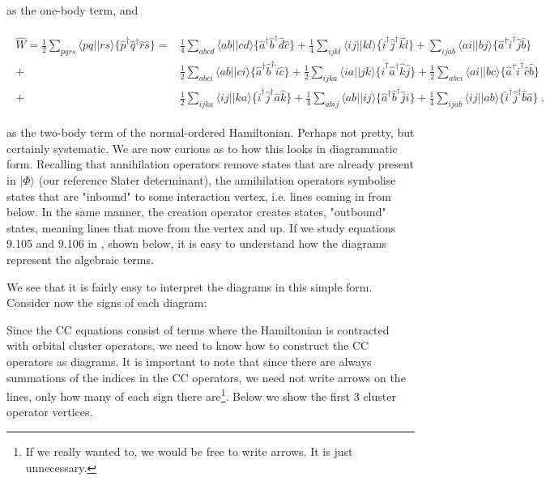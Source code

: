 	\noindent as the one-body term, and
	
	\begin{align}
		\begin{split}
		\hat{W} = \frac{1}{2}\sum_{pqrs}\langle pq||rs\rangle \{\hat{p}^\dagger\hat{q}^\dagger\hat{r}\hat{s}\} = &\frac{1}{4}\sum_{abcd}\langle ab||cd\rangle \{\hat{a}^\dagger\hat{b}^\dagger\hat{d}\hat{c}\} + \frac{1}{4}\sum_{ijkl}\langle ij||kl\rangle \{\hat{i}^\dagger\hat{j}^\dagger\hat{k}\hat{l}\} + \sum_{ijab}\langle ai||bj\rangle \{\hat{a}^\dagger\hat{i}^\dagger\hat{j}\hat{b}\} \\
		+&\frac{1}{2}\sum_{abci}\langle ab||ci\rangle \{\hat{a}^\dagger\hat{b}^\dagger\hat{i}\hat{c}\} + \frac{1}{2}\sum_{ijka}\langle ia||jk\rangle \{\hat{i}^\dagger\hat{a}^\dagger\hat{k}\hat{j}\} + \frac{1}{2}\sum_{abci}\langle ai||bc\rangle \{\hat{a}^\dagger\hat{i}^\dagger\hat{c}\hat{b}\} \\
		+&\frac{1}{2}\sum_{ijka}\langle ij||ka\rangle \{\hat{i}^\dagger\hat{j}^\dagger\hat{a}\hat{k}\} + \frac{1}{4}\sum_{abij}\langle ab||ij\rangle \{\hat{a}^\dagger\hat{b}^\dagger\hat{j}\hat{i}\} + \frac{1}{4}\sum_{ijab}\langle ij||ab\rangle \{\hat{i}^\dagger\hat{j}^\dagger\hat{b}\hat{a}\} \:,
		\end{split}
	\end{align}
	
	\noindent as the two-body term of the normal-ordered Hamiltonian. Perhaps not pretty, but certainly systematic. We are now curious as to how this looks in diagrammatic form. Recalling that annihilation operators remove states that are already present in $|\Phi\rangle$ (our reference Slater determinant), the annihilation operators symbolise states that are "inbound" to some interaction vertex, i.e. lines coming in from below. In the same manner, the creation operator creates states, "outbound" states, meaning lines that move from the vertex and up. If we study equations 9.105 and 9.106 in \cite{ShavittBartlett09}, shown below, it is easy to understand how the diagrams represent the algebraic terms.
	
	
	
	
	We see that it is fairly easy to interpret the diagrams in this simple form. Consider now the signs of each diagram:
	
	
	\newpage
	Since the CC equations consist of terms where the Hamiltonian is contracted with orbital cluster operators, we need to know how to construct the CC operators as diagrams. It is important to note that since there are always summations of the indices in the CC operators, we need not write arrows on the lines, only how many of each sign there are\footnote{If we really wanted to, we would be free to write arrows. It is just unnecessary.}. Below we show the first 3 cluster operator vertices.
	
